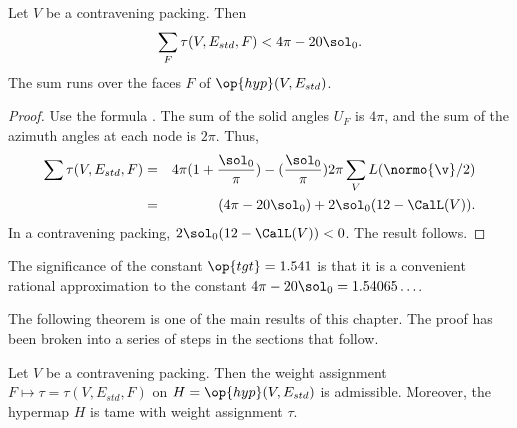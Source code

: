 \begin{lemma}[]
Let $V$ be a contravening packing. %
Then
\begin{displaymath}
\sum_F \tau (V,E_{std},F) < 4\pi - 20\sol_0.
\end{displaymath}
The sum runs over the faces $F$ of $\op{hyp}(V,E_{std})$.
\end{lemma}

\begin{proof}
Use the formula .
  The sum of the solid angles $U_F$ is $4\pi$, and the sum of the azimuth
  angles at each node is $2\pi$.
Thus,
\begin{eqnarray*}\label{eqn:delta0}
  \sum \tau (V,E_{std},F) 
  &=& 4\pi (1 + \dfrac{\sol_0}{\pi}) 
- (\dfrac{\sol_0}{\pi}) 2\pi \sum_{V} L(\normo{\v}/2)\vspace{6pt}\\
&=& (4\pi - 20\sol_0) + 2\sol_0 (12 - \CalL(V)).
\end{eqnarray*}
In a contravening packing, $2\sol_0(12-\CalL(V))<0$.
The result follows.
\end{proof}

The significance of the constant $\op{tgt}=1.541$ is that it is a
convenient rational approximation to the constant $4\pi -
20\sol_0=1.54065\ldots$.  
%

The following theorem is one of the main results of this chapter.  The
proof has been broken into a series of steps in the sections that
follow.

\begin{theorem} \label{theorem:contravene}
  Let $V$ be a contravening packing.  Then the weight assignment
  $F\mapsto\tau=\tau(V,E_{std},F)$ on $H=\op{hyp}(V,E_{std})$ is
  admissible.  Moreover, the hypermap $H$ is tame with weight
  assignment $\tau$.
\end{theorem}
%
%
%



